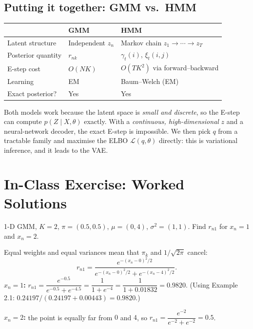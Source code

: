 \documentclass[11pt,a4paper]{article}
\newcommand{\Lb}{\mathcal{L}}
\begin{document}
\subsection{Putting it together: GMM vs.\ HMM}

\begin{center}
\begin{tabular}{@{}lll@{}}
\toprule
& GMM & HMM\\
\midrule
Latent structure & Independent $z_n$ & Markov chain $z_1\to\cdots\to z_T$\\
Posterior quantity & $r_{nk}$ & $\gamma_t(i)$, $\xi_t(i,j)$\\
E-step cost & $O(NK)$ & $O(TK^2)$ via forward--backward\\
Learning & EM & Baum--Welch (EM)\\
Exact posterior? & Yes & Yes\\
\bottomrule
\end{tabular}
\end{center}

\begin{keyidea}
Both models work because the latent space is \emph{small and discrete}, so the E-step can compute $p(Z\mid X,\theta)$ exactly. With a \emph{continuous, high-dimensional} $z$ and a neural-network decoder, the exact E-step is impossible. We then pick $q$ from a tractable family and maximise the ELBO $\Lb(q,\theta)$ directly: this is variational inference, and it leads to the VAE.
\end{keyidea}

\section{In-Class Exercise: Worked Solutions}

\begin{example}
1-D GMM, $K=2$, $\pi=(0.5,0.5)$, $\mu=(0,4)$, $\sigma^2=(1,1)$. Find $r_{n1}$ for $x_n=1$ and $x_n=2$.

Equal weights and equal variances mean that $\pi_k$ and $1/\sqrt{2\pi}$ cancel:
\[
r_{n1}=\frac{e^{-(x_n-0)^2/2}}{e^{-(x_n-0)^2/2}+e^{-(x_n-4)^2/2}}.
\]
\textbf{$x_n=1$:}
$r_{n1}=\dfrac{e^{-0.5}}{e^{-0.5}+e^{-4.5}}=\dfrac{1}{1+e^{-4}}=\dfrac{1}{1+0.01832}=\mathbf{0.9820}$.
(Using Example 2.1: $0.24197/(0.24197+0.00443)=0.9820$.)

\textbf{$x_n=2$:} the point is equally far from $0$ and $4$, so
$r_{n1}=\dfrac{e^{-2}}{e^{-2}+e^{-2}}=\mathbf{0.5}$.
\end{example}
\end{document}
